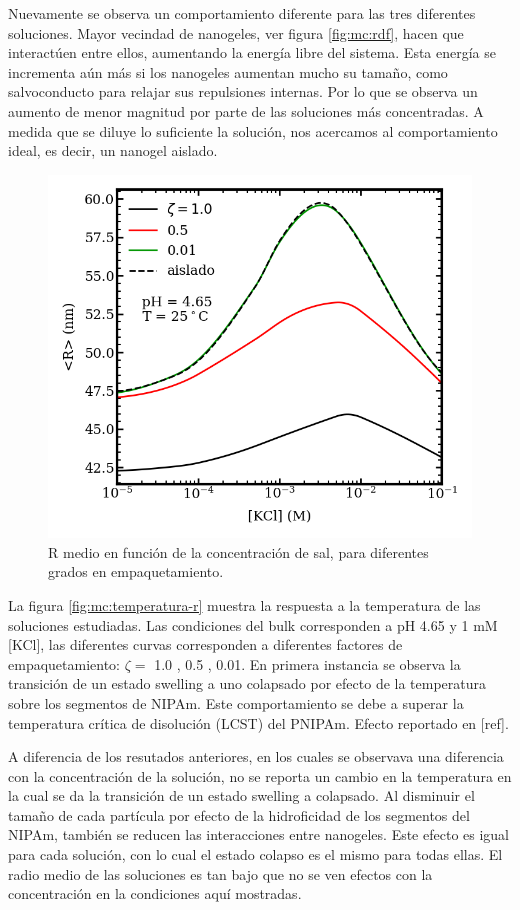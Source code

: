 	Nuevamente se observa un comportamiento diferente para las tres diferentes soluciones. Mayor vecindad de nanogeles, ver figura \ref{fig:mc:rdf}, hacen que interact\'uen entre ellos, aumentando la energ\'ia libre del sistema. Esta energ\'ia se incrementa a\'un m\'as si los nanogeles aumentan mucho su tama\~no, como salvoconducto para relajar sus repulsiones internas. Por lo que se observa un aumento de menor magnitud por parte de las soluciones m\'as concentradas. A medida que se diluye lo suficiente la soluci\'on, nos acercamos al comportamiento ideal, es decir, un nanogel aislado.
	
	
	
	\begin{figure}
		\centering
		\includegraphics[width=0.45\linewidth]{Figures/graph-mc/salt-r.png}
		\caption{R medio en funci\'on de la concentraci\'on de sal, para diferentes grados en empaquetamiento.}
		\label{fig:mc:reentrante}
	\end{figure}
	
	La figura \ref{fig:mc:temperatura-r} muestra la respuesta a la temperatura de las soluciones estudiadas. Las condiciones del bulk corresponden a pH 4.65 y 1 mM [KCl], las diferentes curvas corresponden a diferentes factores de empaquetamiento: $\zeta =$  1.0 , 0.5 , 0.01.
	En primera instancia se observa la transici\'on de un estado swelling a uno colapsado por efecto de la temperatura sobre los segmentos de NIPAm.
	Este comportamiento se debe a superar la temperatura cr\'itica de disoluci\'on (LCST) del PNIPAm. Efecto reportado en [ref].
	
	A diferencia de los resutados anteriores, en los cuales se observava una diferencia con la concentraci\'on de la soluci\'on, no se reporta un cambio en la temperatura en la cual se da la transici\'on de un estado swelling a colapsado. 
	Al disminuir el tama\~no de cada part\'icula por efecto de la hidroficidad de los segmentos del NIPAm, tambi\'en se reducen las interacciones entre nanogeles. Este efecto es igual para cada soluci\'on, con lo cual el estado colapso es el mismo para todas ellas.
	El radio medio de las soluciones es tan bajo que no se ven efectos con la concentraci\'on en la condiciones aqu\'i mostradas. 
	

